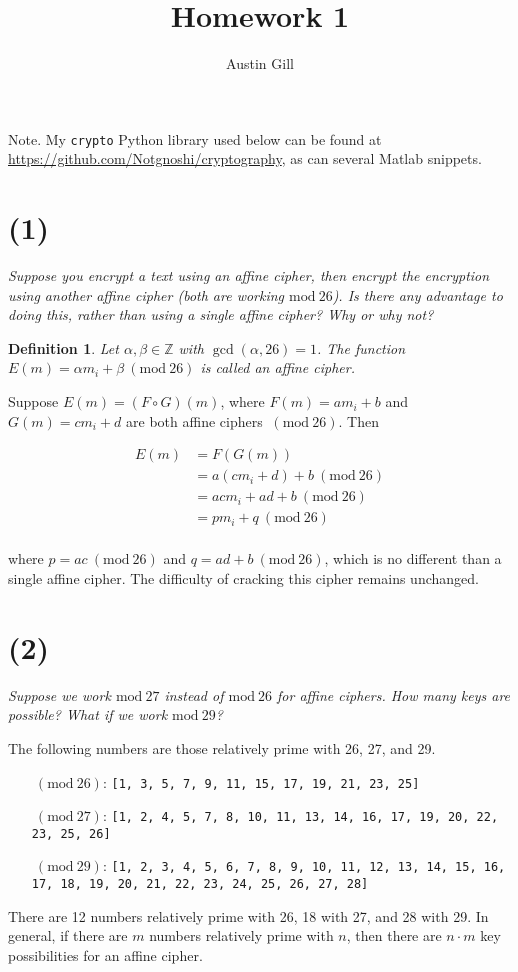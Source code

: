 \documentclass[12pt]{article}
\title{Homework 1}
\author{Austin Gill}
\renewcommand{\mod}[1]{\mathrm{mod}\ #1}
\renewcommand{\pmod}[1]{\ (\mod{#1})}
\newtheorem*{defn}{Definition}
\begin{document}
\maketitle

Note. My \texttt{crypto} Python library used below can be found at \url{https://github.com/Notgnoshi/cryptography}, as can several Matlab snippets.
\section*{(1)} \textit{Suppose you encrypt a text using an affine cipher, then encrypt the encryption using another affine cipher (both are working $\mod{26}$). Is there any advantage to doing this, rather than using a single affine cipher? Why or why not?}

\begin{defn}
Let $\alpha , \beta \in \mathbb Z$ with $\gcd(\alpha , 26) = 1$. The function $E(m) = \alpha m_i + \beta \pmod{26}$ is called an affine cipher.
\end{defn}

Suppose $E(m) = (F \circ G)(m)$, where $F(m) = am_i + b$ and $G(m) = cm_i + d$ are both affine ciphers $\pmod{26}$. Then

\begin{align*}
    E(m) &= F(G(m))\\
         &= a(cm_i + d) + b \pmod{26}\\
         &= acm_i + ad + b \pmod{26}\\
         &= pm_i + q \pmod{26}\\
\end{align*}

where $p = ac \pmod{26}$ and $q = ad + b \pmod{26}$, which is no different than a single affine cipher. The difficulty of cracking this cipher remains unchanged.

\section*{(2)} \textit{Suppose we work $\mod{27}$ instead of $\mod{26}$ for affine ciphers. How many keys are possible? What if we work $\mod{29}$?}

The following numbers are those relatively prime with 26, 27, and 29.
\begin{itemize}
  \item[$\pmod{26}$:]
  \texttt{[1, 3, 5, 7, 9, 11, 15, 17, 19, 21, 23, 25]}
  \item[$\pmod{27}$:]
  \texttt{[1, 2, 4, 5, 7, 8, 10, 11, 13, 14, 16, 17, 19, 20, 22, 23, 25, 26]}
  \item[$\pmod{29}$:]
  \texttt{[1, 2, 3, 4, 5, 6, 7, 8, 9, 10, 11, 12, 13, 14, 15, 16, 17, 18, 19, 20, 21, 22, 23, 24, 25, 26, 27, 28]}
\end{itemize}
There are 12 numbers relatively prime with 26, 18 with 27, and 28 with 29. In general, if there are $m$ numbers relatively prime with $n$, then there are $n\cdot m$ key possibilities for an affine cipher.
\end{document}
